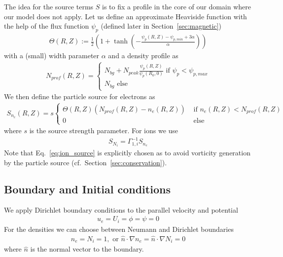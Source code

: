 The idea for the source terms $S$ is to fix a profile in the core of our domain
where our model does not apply.
Let us define an approximate Heaviside function with the help of the flux function $\psi_p$ (defined later in Section~\ref{sec:magnetic})
\begin{align}
  \Theta(R,Z) := \frac{1}{2}\left( 1 + \tanh\left( - \frac{\psi_p(R,Z) - \psi_{p,min} + 3\alpha}{\alpha} \right) \right)
  \label{eq:source_profile}
\end{align}
with a (small) width parameter $\alpha$
and a density profile as
\begin{align}
  N_{prof}(R,Z)=\begin{cases}
    N_{bg} + N_{peak}\frac{\psi_p(R,Z)} {\psi_p(R_0, 0)} \text{ if }\psi_p < \psi_{p,max} \\
    N_{bg} \text{ else }
  \end{cases}
  \label{eq:density_profile}
\end{align}
We then define the particle source for electrons as
\begin{align}
  S_{n_e}(R,Z) = s\begin{cases}
    \Theta(R,Z)(N_{prof}(R,Z) - n_e(R,Z)) &\text{ if } n_e(R,Z)<N_{prof}(R,Z)\\
    0 &\text{ else}
  \end{cases}
  \label{eq:electron_source}
\end{align}
where $s$ is the source strength parameter.
For ions we use
\begin{align}
    S_{N_i} = \Gamma_{1,i}^{-1} S_{n_e}
  \label{eq:ion_source}
\end{align}
Note that Eq.~\eqref{eq:ion_source} is explicitly chosen as to avoid vorticity generation
by the particle source (cf.~Section~\ref{sec:conservation}).

\subsection{Boundary and Initial conditions}
We apply Dirichlet boundary conditions to the parallel velocity and potential
\begin{align}
u_e = U_i = \phi = \psi = 0
\end{align}
For the densities we can choose between Neumann and Dirichlet boundaries
\begin{align}
n_e = N_i = 1, \text{ or } \hat n \cdot \nabla n_e = \hat n \cdot \nabla N_i = 0
\end{align}
where $\hat n$ is the normal vector to the boundary.

